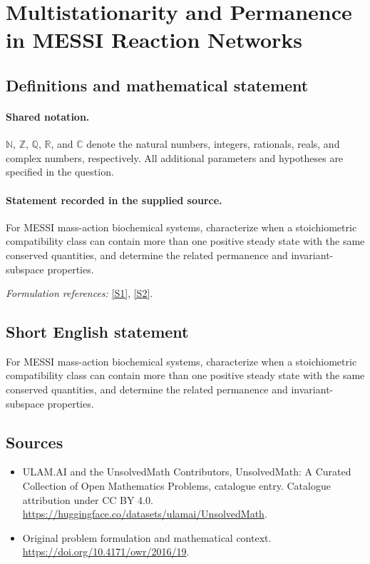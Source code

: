 \documentclass[11pt]{article}
\newcommand{\sref}[2]{\hyperlink{source:#1:#2}{[S#2]}}
\begin{document}
\section{Multistationarity and Permanence in MESSI Reaction Networks}\label{statement}

\subsection{Definitions and mathematical statement}

\paragraph{Shared notation.}$\mathbb N$, $\mathbb Z$, $\mathbb Q$, $\mathbb R$, and $\mathbb C$ denote the natural numbers, integers, rationals, reals, and complex numbers, respectively. All additional parameters and hypotheses are specified in the question.


\paragraph{Statement recorded in the supplied source.}
For MESSI mass-action biochemical systems, characterize when a stoichiometric compatibility class can contain more than one positive steady state with the same conserved quantities, and determine the related permanence and invariant-subspace properties.
\par\smallskip\textit{Formulation references:} \sref{statement}{1}, \sref{statement}{2}.
\subsection{Short English statement}
For MESSI mass-action biochemical systems, characterize when a stoichiometric compatibility class can contain more than one positive steady state with the same conserved quantities, and determine the related permanence and invariant-subspace properties.
\subsection{Sources}
\begin{itemize}
\item[\hypertarget{source:statement:1}{S1}] ULAM.AI and the UnsolvedMath Contributors, UnsolvedMath: A Curated Collection of Open Mathematics Problems, catalogue entry. Catalogue attribution under CC BY 4.0.
\url{https://huggingface.co/datasets/ulamai/UnsolvedMath}.
\item[\hypertarget{source:statement:2}{S2}] Original problem formulation and mathematical context.
\url{https://doi.org/10.4171/owr/2016/19}.
\end{itemize}
\label{end:statement}
\end{document}
